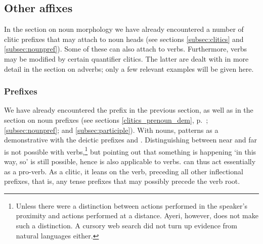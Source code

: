 


\subsection{Other affixes}

In the section on noun morphology we have already encountered a number of
clitic prefixes that may attach to noun heads (see sections
\ref{subsec:clitics} and \ref{subsec:nounpref}). Some of these can also attach
to verbs. Furthermore, verbs may be modified by certain quantifier clitics. The
latter are dealt with in more detail in the section on adverbs; only a few
relevant examples will be given here.

\subsubsection{Prefixes}
\label{subsubsec:verbprefixes}

We have already encountered the prefix  in the
previous section, as well as in the section on noun prefixes (see sections
\ref{clitics_prenoun_dem}, p.~\pageref{clitics_prenoun_dem}; 
\ref{subsec:nounpref}; and \ref{subsec:participle}). With nouns,
 patterns as a demonstrative with the deictic prefixes
 and . Distinguishing between near
and far is not possible with verbs,\footnote{Unless there were a distinction
between actions performed in the speaker's proximity and actions performed at a
distance. Ayeri, however, does not make such a distinction. A cursory web
search did not turn up evidence from natural languages either.} but pointing
out that something is happening `in this way, so' is still possible, hence
 is also applicable to verbs.  can thus act
essentially as a pro-verb. As a clitic, it leans on the verb, preceding all
other inflectional prefixes, that is, any tense prefixes that may possibly
precede the verb root.

